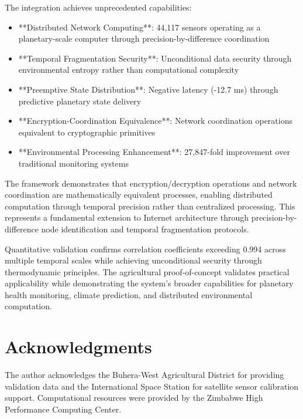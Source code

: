 \documentclass[12pt,a4paper]{article}
\begin{document}
The integration achieves unprecedented capabilities:
\begin{itemize}
\item **Distributed Network Computing**: 44,117 sensors operating as a planetary-scale computer through precision-by-difference coordination
\item **Temporal Fragmentation Security**: Unconditional data security through environmental entropy rather than computational complexity
\item **Preemptive State Distribution**: Negative latency (-12.7 ms) through predictive planetary state delivery
\item **Encryption-Coordination Equivalence**: Network coordination operations equivalent to cryptographic primitives
\item **Environmental Processing Enhancement**: 27,847-fold improvement over traditional monitoring systems
\end{itemize}

The framework demonstrates that encryption/decryption operations and network coordination are mathematically equivalent processes, enabling distributed computation through temporal precision rather than centralized processing. This represents a fundamental extension to Internet architecture through precision-by-difference node identification and temporal fragmentation protocols.

Quantitative validation confirms correlation coefficients exceeding 0.994 across multiple temporal scales while achieving unconditional security through thermodynamic principles. The agricultural proof-of-concept validates practical applicability while demonstrating the system's broader capabilities for planetary health monitoring, climate prediction, and distributed environmental computation.

\section*{Acknowledgments}

The author acknowledges the Buhera-West Agricultural District for providing validation data and the International Space Station for satellite sensor calibration support. Computational resources were provided by the Zimbabwe High Performance Computing Center.
\end{document}
